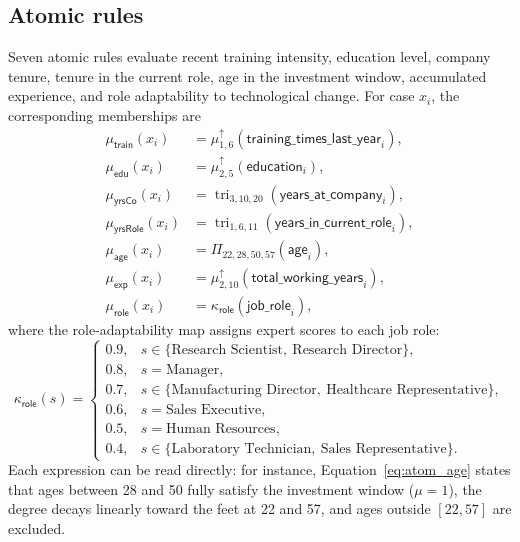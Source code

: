 \documentclass{interact}
\begin{document}
\subsection{Atomic rules}\label{app:context_math_atomic}

Seven atomic rules evaluate recent training intensity, education level, company tenure, tenure in the current role, age in the investment window, accumulated experience, and role adaptability to technological change. For case $x_i$, the corresponding memberships are
\begin{align}
\mu_{\textsf{train}}(x_i) &= \mu^{\uparrow}_{1,6}\!\left(\textsf{training\_times\_last\_year}_i\right), \label{eq:atom_train}\\
\mu_{\textsf{edu}}(x_i) &= \mu^{\uparrow}_{2,5}\!\left(\textsf{education}_i\right), \label{eq:atom_edu}\\
\mu_{\textsf{yrsCo}}(x_i) &= \operatorname{tri}_{3,10,20}\!\left(\textsf{years\_at\_company}_i\right), \label{eq:atom_yrsco}\\
\mu_{\textsf{yrsRole}}(x_i) &= \operatorname{tri}_{1,6,11}\!\left(\textsf{years\_in\_current\_role}_i\right), \label{eq:atom_yrsrole}\\
\mu_{\textsf{age}}(x_i) &= \Pi_{22,28,50,57}\!\left(\textsf{age}_i\right), \label{eq:atom_age}\\
\mu_{\textsf{exp}}(x_i) &= \mu^{\uparrow}_{2,10}\!\left(\textsf{total\_working\_years}_i\right), \label{eq:atom_exp}\\
\mu_{\textsf{role}}(x_i) &= \kappa_{\textsf{role}}\!\left(\textsf{job\_role}_i\right), \label{eq:atom_role}
\end{align}
where the role-adaptability map assigns expert scores to each job role:
\begin{equation}
\kappa_{\textsf{role}}(s)=
\begin{cases}
0.9, & s\in\{\text{Research Scientist},\ \text{Research Director}\},\\
0.8, & s=\text{Manager},\\
0.7, & s\in\{\text{Manufacturing Director},\ \text{Healthcare Representative}\},\\
0.6, & s=\text{Sales Executive},\\
0.5, & s=\text{Human Resources},\\
0.4, & s\in\{\text{Laboratory Technician},\ \text{Sales Representative}\}.
\end{cases}
\label{eq:kappa_role}
\end{equation}
Each expression can be read directly: for instance, Equation~\eqref{eq:atom_age} states that ages between 28 and 50 fully satisfy the investment window ($\mu=1$), the degree decays linearly toward the feet at 22 and 57, and ages outside $[22,57]$ are excluded.
\end{document}

